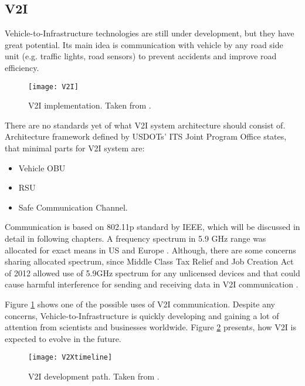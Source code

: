 \subsection{V2I}
% 
Vehicle-to-Infrastructure technologies are still under development, but they have great potential. Its main idea is communication with vehicle by any road side unit (e.g. traffic lights, road sensors) to prevent accidents and improve road efficiency.\par
% 
\begin{figure}[h]
\texttt{[image: V2I]}
\caption{\acrshort{V2I} implementation. Taken from \cite{U.S.GovernmentAccountabilityOffice2015IntelligentExist}.}
\label{fig:V2Iimplementation}
\centering
\end{figure}
% 
There are no standards yet of what \acrshort{V2I} system architecture should consist of. Architecture framework defined by USDOTs' ITS Joint Program Office \cite{Dr.Gaspar2014HighlySystems} states, that minimal parts for \acrshort{V2I} system are:
\begin{itemize}[noitemsep]
    \item Vehicle \acrlong{OBU}
    \item \acrlong{RSU}
    \item Safe Communication Channel.
\end{itemize}
% 
Communication is based on 802.11p standard by \acrshort{IEEE}, which will be discussed in detail in following chapters. A frequency spectrum in 5.9 GHz range was allocated for exact means in US and Europe \cite{2011TheTechnology}. Although, there are some concerns sharing allocated spectrum, since Middle Class Tax Relief and Job Creation Act of 2012 allowed use of 5.9GHz spectrum for any unlicensed devices and that could cause harmful interference for sending and receiving data in \acrshort{V2I} communication \cite{U.S.GovernmentAccountabilityOffice2015IntelligentExist}.\par
% 
Figure \ref{fig:V2Iimplementation} shows one of the possible uses of \acrshort{V2I} communication. Despite any concerns, Vehicle-to-Infrastructure is quickly developing and gaining a lot of attention from scientists and businesses worldwide. Figure \ref{fig:V2Idevelopment} presents, how \acrshort{V2I} is expected to evolve in the future.\par
%
\begin{figure}[h]
\texttt{[image: V2Xtimeline]}
\caption{\acrshort{V2I} development path. Taken from \cite{U.S.GovernmentAccountabilityOffice2015IntelligentExist}.}
\label{fig:V2Idevelopment}
\centering
\end{figure}
